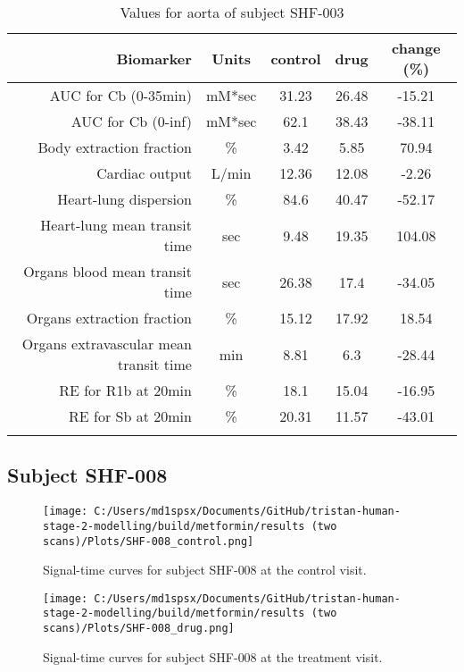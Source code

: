 \documentclass{epflreport}%
\begin{document}
\begin{longtable}{rcccc}%
\hline%
Biomarker&Units&control&drug&change (\%)\\%
\hline%
AUC for Cb (0{-}35min)&mM*sec&31.23&26.48&{-}15.21\\%
AUC for Cb (0{-}inf)&mM*sec&62.1&38.43&{-}38.11\\%
Body extraction fraction&\%&3.42&5.85&70.94\\%
Cardiac output&L/min&12.36&12.08&{-}2.26\\%
Heart{-}lung dispersion&\%&84.6&40.47&{-}52.17\\%
Heart{-}lung mean transit time&sec&9.48&19.35&104.08\\%
Organs blood mean transit time&sec&26.38&17.4&{-}34.05\\%
Organs extraction fraction&\%&15.12&17.92&18.54\\%
Organs extravascular mean transit time&min&8.81&6.3&{-}28.44\\%
RE for R1b at 20min&\%&18.1&15.04&{-}16.95\\%
RE for Sb at 20min&\%&20.31&11.57&{-}43.01\\%
\hline%
\caption{Values for aorta of subject SHF-003} \\%
\end{longtable}%
\clearpage%
\subsection{Subject SHF{-}008}%
\label{subsec:SubjectSHF{-}008}%

%


\begin{figure}[h!]%
\centering%
\texttt{[image: C:/Users/md1spsx/Documents/GitHub/tristan-human-stage-2-modelling/build/metformin/results (two scans)/Plots/SHF-008\_control.png]}%
\caption{Signal{-}time curves for subject SHF{-}008 at the control visit.}%
\end{figure}

%


\begin{figure}[h!]%
\centering%
\texttt{[image: C:/Users/md1spsx/Documents/GitHub/tristan-human-stage-2-modelling/build/metformin/results (two scans)/Plots/SHF-008\_drug.png]}%
\caption{Signal{-}time curves for subject SHF{-}008 at the treatment visit.}%
\end{figure}
\end{document}
